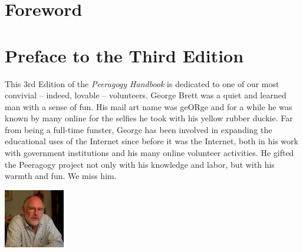 \documentclass[ebook, 12pt, twoside]{memoir}
\begin{document}
\newpage
\pagestyle{plain}
\chapter*{Foreword}
%


\newpage
\chapter*{Preface to the Third Edition}

This 3rd Edition of the \emph{Peeragogy Handbook} is dedicated to one
of our most convivial -- indeed, lovable -- volunteers. George Brett
was a quiet and learned man with a sense of fun.  His mail art name
was geORge and for a while he was known by many online for the selfies
he took with his yellow rubber duckie. Far from being a full-time
funster, George has been involved in expanding the educational uses of
the Internet since before it was the Internet, both in his work with
government institutions and his many online volunteer activities. He
gifted the Peeragogy project not only with his knowledge and labor,
but with his warmth and fun.  We miss him.

\begin{center}
 \includegraphics[width=.8\textwidth]{../pictures/george.jpg}
\end{center}
\end{document}
